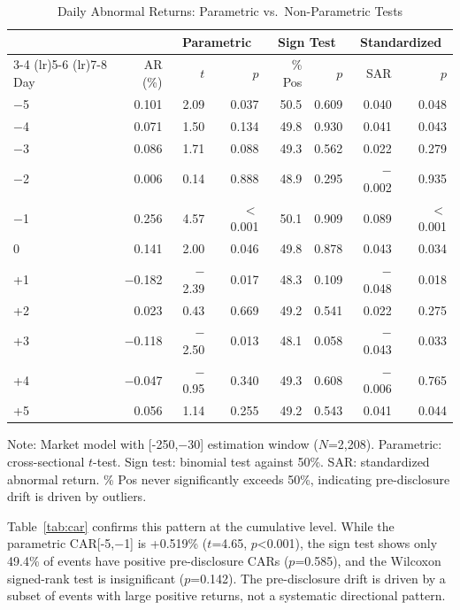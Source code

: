 \documentclass[review,authoryear]{elsarticle}
\begin{document}
\begin{table}[H]
\centering
\begin{threeparttable}
\caption{Daily Abnormal Returns: Parametric vs.\ Non-Parametric Tests}
\label{tab:ar}
\begin{tabular}{lrrrrrrr}
\toprule
& & \multicolumn{2}{c}{Parametric} & \multicolumn{2}{c}{Sign Test} & \multicolumn{2}{c}{Standardized} \\
\cmidrule(lr){3-4} \cmidrule(lr){5-6} \cmidrule(lr){7-8}
Day & AR (\%) & $t$ & $p$ & \% Pos & $p$ & SAR & $p$ \\
\midrule
$-$5 & 0.101 & 2.09 & 0.037 & 50.5 & 0.609 & 0.040 & 0.048 \\
$-$4 & 0.071 & 1.50 & 0.134 & 49.8 & 0.930 & 0.041 & 0.043 \\
$-$3 & 0.086 & 1.71 & 0.088 & 49.3 & 0.562 & 0.022 & 0.279 \\
$-$2 & 0.006 & 0.14 & 0.888 & 48.9 & 0.295 & $-$0.002 & 0.935 \\
$-$1 & 0.256 & 4.57 & $<$0.001 & 50.1 & 0.909 & 0.089 & $<$0.001 \\
\midrule
0 & 0.141 & 2.00 & 0.046 & 49.8 & 0.878 & 0.043 & 0.034 \\
+1 & $-$0.182 & $-$2.39 & 0.017 & 48.3 & 0.109 & $-$0.048 & 0.018 \\
\midrule
+2 & 0.023 & 0.43 & 0.669 & 49.2 & 0.541 & 0.022 & 0.275 \\
+3 & $-$0.118 & $-$2.50 & 0.013 & 48.1 & 0.058 & $-$0.043 & 0.033 \\
+4 & $-$0.047 & $-$0.95 & 0.340 & 49.3 & 0.608 & $-$0.006 & 0.765 \\
+5 & 0.056 & 1.14 & 0.255 & 49.2 & 0.543 & 0.041 & 0.044 \\
\bottomrule
\end{tabular}
\begin{tablenotes}
\small
\item Note: Market model with [-250,$-$30] estimation window ($N$=2,208). Parametric: cross-sectional $t$-test. Sign test: binomial test against 50\%. SAR: standardized abnormal return. \% Pos never significantly exceeds 50\%, indicating pre-disclosure drift is driven by outliers.
\end{tablenotes}
\end{threeparttable}
\end{table}

Table~\ref{tab:car} confirms this pattern at the cumulative level. While the parametric CAR[-5,$-$1] is +0.519\% ($t$=4.65, $p$<0.001), the sign test shows only 49.4\% of events have positive pre-disclosure CARs ($p$=0.585), and the Wilcoxon signed-rank test is insignificant ($p$=0.142). The pre-disclosure drift is driven by a subset of events with large positive returns, not a systematic directional pattern.
\end{document}

